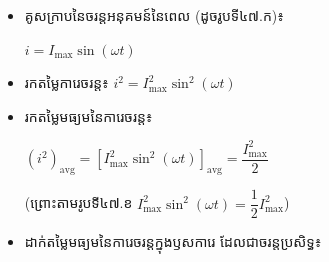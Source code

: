 \vspace{0.2em}
\noindent
\begin{minipage}[t]{0.56\textwidth}
	\begin{itemize}[itemsep=4pt, topsep=1pt, parsep=0pt, leftmargin=1.5em]
		\item គូសក្រាបនៃចរន្តអនុគមន៍នៃពេល (ដូចរូបទី៤៧.ក)៖
		\begin{center}
			$i = I_{\max}\sin(\omega t)$
		\end{center}
		\item រកតម្លៃការេចរន្ត៖ $i^2 = I_{\max}^2\sin^2(\omega t)$
		\item រកតម្លៃមធ្យមនៃការេចរន្ត៖
		\begin{center}
			$\left(i^2\right)_{\mathrm{avg}} = \left[I_{\max}^2\sin^2(\omega t)\right]_{\mathrm{avg}} = \dfrac{I_{\max}^2}{2}$
		\end{center}
		(ព្រោះតាមរូបទី៤៧.ខ \quad $I_{\max}^2\sin^2(\omega t) = \dfrac{1}{2}I_{\max}^2$)
		\item ដាក់តម្លៃមធ្យមនៃការេចរន្តក្នុងឫសការេ ដែលជាចរន្តប្រសិទ្ធ៖
	\end{itemize}
\end{minipage}%
\hfill
